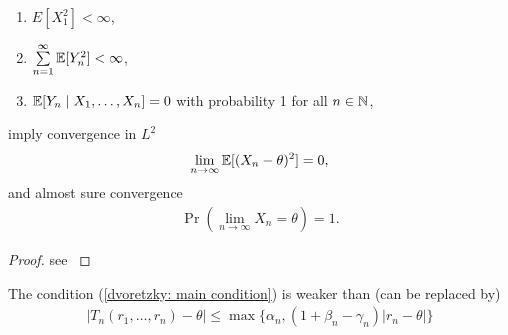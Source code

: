 \begin{thm}
\begin{enumerate}
        \item \(E[X_1^2]<\infty\),
        \item \(\sum\limits_{n=1}^\infty \mathbb{E}[Y_n^2]<\infty\),
        \item \(\mathbb{E}[Y_n\mid X_1,\dots,X_n]=0\) with probability 1 for all \(n\in\mathbb{N}\),
    \end{enumerate}
    imply convergence in \(L^2\)
    \begin{align*}
        \lim_{n\to\infty} \mathbb{E}[(X_n-\theta)^2]=0,
    \end{align*}
    and almost sure convergence
    \begin{align*}
        \Pr(\lim_{n\to\infty} X_n=\theta)=1.
    \end{align*}
\end{thm}
\begin{proof}
    see \textcite{dvoretzkyStochasticApproximation1956}
\end{proof}
\begin{remark}
    The condition (\ref{dvoretzky: main condition}) is weaker than (can be replaced by)
    \begin{align}\label{dvoretzky: alt main cond}
        |T_n(r_1,\dots,r_n)-\theta|\le \max \{\alpha_n, (1+\beta_n -\gamma_n)|r_n-\theta|\}
    \end{align}
\end{remark}
